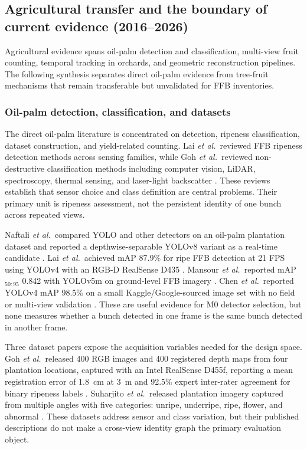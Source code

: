 \subsection{Agricultural transfer and the boundary of current evidence (2016--2026)}

Agricultural evidence spans oil-palm detection and classification, multi-view fruit counting, temporal tracking in orchards, and geometric reconstruction pipelines. The following synthesis separates direct oil-palm evidence from tree-fruit mechanisms that remain transferable but unvalidated for FFB inventories.

\subsubsection{Oil-palm detection, classification, and datasets}

The direct oil-palm literature is concentrated on detection, ripeness classification, dataset construction, and yield-related counting. Lai \textit{et al.}\ reviewed FFB ripeness detection methods across sensing families, while Goh \textit{et al.}\ reviewed non-destructive classification methods including computer vision, LiDAR, spectroscopy, thermal sensing, and laser-light backscatter \cite{lai2023palmslr,goh2025palmreview}. These reviews establish that sensor choice and class definition are central problems. Their primary unit is ripeness assessment, not the persistent identity of one bunch across repeated views.

Naftali \textit{et al.}\ compared YOLO and other detectors on an oil-palm plantation dataset and reported a depthwise-separable YOLOv8 variant as a real-time candidate \cite{naftali2024palmcounter}. Lai \textit{et al.}\ achieved mAP 87.9\% for ripe FFB detection at 21 FPS using YOLOv4 with an RGB-D RealSense D435 \cite{lai2022yolov4palm}. Mansour \textit{et al.}\ reported mAP$_{50{:}95}$ 0.842 with YOLOv5m on ground-level FFB imagery \cite{ledger_r_19d96439ecdda18d}. Chen \textit{et al.}\ reported YOLOv4 mAP 98.5\% on a small Kaggle/Google-sourced image set with no field or multi-view validation \cite{chen2022ffbdet}. These are useful evidence for M0 detector selection, but none measures whether a bunch detected in one frame is the same bunch detected in another frame.

Three dataset papers expose the acquisition variables needed for the design space. Goh \textit{et al.}\ released 400 RGB images and 400 registered depth maps from four plantation locations, captured with an Intel RealSense D455f, reporting a mean registration error of 1.8~cm at 3~m and 92.5\% expert inter-rater agreement for binary ripeness labels \cite{goh2025palmdataset}. Suharjito \textit{et al.}\ released plantation imagery captured from multiple angles with five categories: unripe, underripe, ripe, flower, and abnormal \cite{suharjito2025palmdataset}. These datasets address sensor and class variation, but their published descriptions do not make a cross-view identity graph the primary evaluation object.

